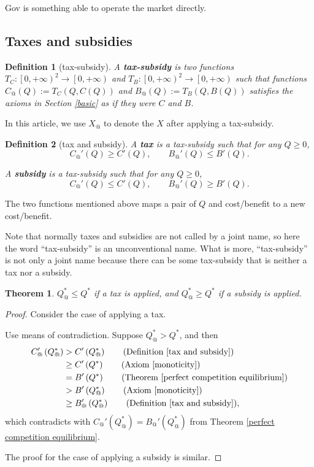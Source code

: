 \documentclass{article}
\newtheorem{theorem}{Theorem}
\newtheorem{definition}{Definition}
\begin{document}
Gov is something able to operate the market directly.

\subsection{Taxes and subsidies}

\begin{definition}[tax-subsidy]
\label{tax-subsidy}
A \textbf{tax-subsidy} is two functions
$T_C:\left[0,+\infty\right)^2\to\left[0,+\infty\right)$ and
$T_B:\left[0,+\infty\right)^2\to\left[0,+\infty\right)$
such that functions $C_@\left(Q\right):=T_C\left(Q,C\left(Q\right)\right)$
and $B_@\left(Q\right):=T_B\left(Q,B\left(Q\right)\right)$
satisfies the axioms in Section \ref{basic} as if they were $C$ and $B$.
\end{definition}

In this article, we use $X_@$ to denote the $X$ after applying a tax-subsidy.

\begin{definition}[tax and subsidy]
\label{tax and subsidy}
A \textbf{tax} is a tax-subsidy such that for any $Q\ge0$,
$$C_@'\left(Q\right)\ge C'\left(Q\right),
\qquad B_@'\left(Q\right)\le B'\left(Q\right).$$

A \textbf{subsidy} is a tax-subsidy such that for any $Q\ge0$,
$$C_@'\left(Q\right)\le C'\left(Q\right),
\qquad B_@'\left(Q\right)\ge B'\left(Q\right).$$
\end{definition}

The two functions mentioned above maps a pair of $Q$ and cost/benefit to a new cost/benefit.

Note that normally taxes and subsidies are not called by a joint name,
so here the word ``tax-subsidy'' is an unconventional name.
What is more, ``tax-subsidy'' is not only a joint name
because there can be some tax-subsidy that is neither a tax nor a subsidy.

\begin{theorem}
\label{effect of tax and subsidy}
$Q_@^*\le Q^*$ if a tax is applied, and $Q_@^*\ge Q^*$ if a subsidy is applied.
\end{theorem}
\begin{proof}
Consider the case of applying a tax.

Use means of contradiction.
Suppose $Q_@^*>Q^*$, and then
\begin{align*}
C_@'\left(Q_@^*\right)&>C'\left(Q_@^*\right)\qquad\text{(Definition \ref{tax and subsidy})}\\
&\ge C'\left(Q^*\right)\qquad\text{(Axiom \ref{monoticity})}\\
&=B'\left(Q^*\right)\qquad\text{(Theorem \ref{perfect competition equilibrium})}\\\
&>B'\left(Q_@^*\right)\qquad\text{(Axiom \ref{monoticity})}\\
&\ge B_@'\left(Q_@^*\right)\qquad\text{(Definition \ref{tax and subsidy})},
\end{align*}
which contradicts with $C_@'\left(Q_@^*\right)=B_@'\left(Q_@^*\right)$ from Theorem \ref{perfect competition equilibrium}.

The proof for the case of applying a subsidy is similar.
\end{proof}
\end{document}
